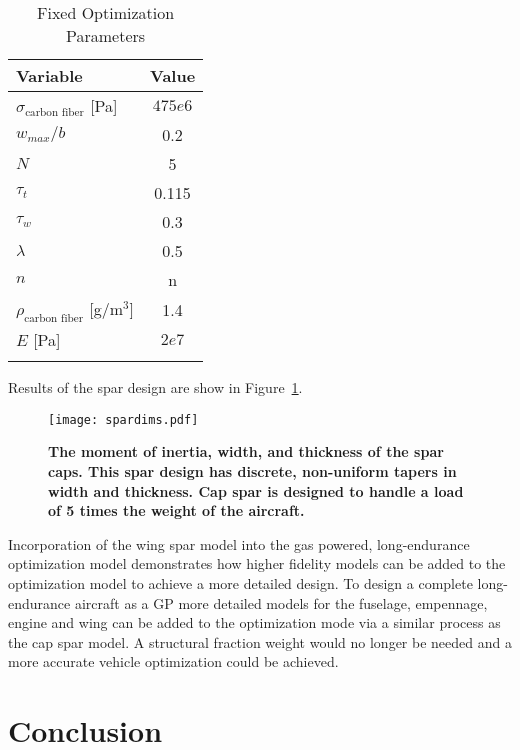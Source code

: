 \documentclass[]{aiaa-tc}%
\begin{document}
\begin{longtable}{lc}
     \caption{Fixed Optimization Parameters} \\
     \toprule
     \toprule
     Variable &  Value  \\
     \midrule
     $\sigma_{\text{carbon fiber}}$ [Pa] & $475e6$ \\
     $w_{max}/b$          & 0.2    \\ 
     $N$                  & 5      \\ 
     $\tau_t$             & 0.115  \\ 
     $\tau_w$             & 0.3    \\ 
     $\lambda$            & 0.5    \\ 
     $n$                  & n      \\ 
     $\rho_{\text{carbon fiber}}$ [g/m$^3$] & 1.4 \\
     $E$ [Pa] & $2e7$\\
     \bottomrule
     \label{t:sparparams}
\end{longtable}

Results of the spar design are show in Figure~\ref{f:spardims}.

\begin{figure}[h!]
	\begin{center}
	\texttt{[image: spardims.pdf]}
    \caption{ \textbf{ The moment of inertia, width, and thickness of the spar caps. This spar design has discrete, non-uniform tapers in width and thickness.  Cap spar is designed to handle a load of 5 times the weight of the aircraft.}}
	\label{f:spardims}
	\end{center}
\end{figure}
 


Incorporation of the wing spar model into the gas powered, long-endurance optimization model demonstrates how higher fidelity models can be added to the optimization model to achieve a more detailed design.  
To design a complete long-endurance aircraft as a GP more detailed models for the fuselage, empennage, engine and wing can be added to the optimization mode via a similar process as the cap spar model. A structural fraction weight would no longer be needed and a more accurate vehicle optimization could be achieved.
 
\section{Conclusion}
\end{document}
